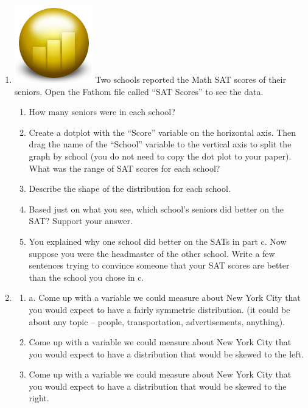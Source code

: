 \documentclass[12pt]{article}
\theoremstyle{plain}     %
\begin{document}
\begin{enumerate}
	\item \includegraphics[scale=.1]{fathom.png} Two schools reported the Math SAT scores of their seniors.  Open the Fathom file called “SAT Scores” to see the data.
	\begin{enumerate}
		\item How many seniors were in each school?
		\item Create a dotplot with the “Score” variable on the horizontal axis.  Then drag the name of the “School” variable to the vertical axis to split the graph by school (you do not need to copy the dot plot to your paper).  What was the range of SAT scores for each school?
		\item Describe the shape of the distribution for each school.
		\item Based just on what you see, which school’s seniors did better on the SAT?  Support your answer.
		\item You explained why one school did better on the SATs in part c.  Now suppose you were the headmaster of the other school.  Write a few sentences trying to convince someone that your SAT scores are better than the school you chose in c.
\end{enumerate}	 

	\item 
		\begin{enumerate}
			\item a.	Come up with a variable we could measure about New York City that you would expect to have a fairly symmetric distribution.  (it could be about any topic – people, transportation, advertisements, anything).
			\item Come up with a variable we could measure about New York City that you would expect to have a distribution that would be skewed to the left. 
			\item Come up with a variable we could measure about New York City that you would expect to have a distribution that would be skewed to the right. 
		
		\end{enumerate}

\newpage


\end{enumerate}
\end{document}
